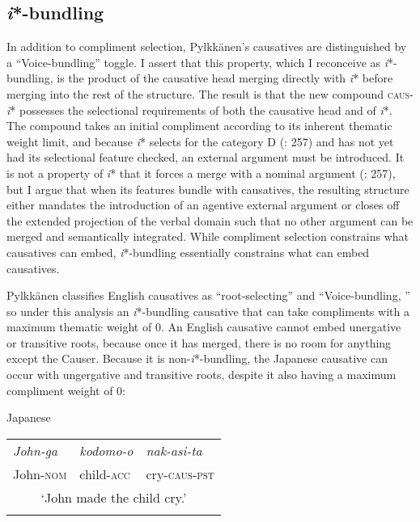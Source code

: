 \documentclass[output=paper]{langscibook}
\begin{document}
\subsection{\textit{i}*-bundling}\label{sec:wechsler:2.4}

In addition to compliment selection, Pylkkänen’s causatives are distinguished by a “Voice-bundling” toggle. I assert that this property, which I reconceive as \textit{i}*-bundling, is the product of the causative head merging directly with \textit{i}* before merging into the rest of the structure. The result is that the new compound \textsc{caus}{}-\textit{i}* possesses the selectional requirements of both the causative head and of \textit{i}*. The compound takes an initial compliment according to its inherent thematic weight limit, and because \textit{i}* selects for the category D (\citealt{WoodMarantz2017}: 257) and has not yet had its selectional feature checked, an external argument must be introduced. It is not a property of \textit{i}* that it forces a merge with a nominal argument (\citealt{WoodMarantz2017}: 257), but I argue that when its features bundle with causatives, the resulting structure either mandates the introduction of an agentive external argument or closes off the extended projection of the verbal domain such that no other argument can be merged and semantically integrated. While compliment selection constrains what causatives can embed, \textit{i}*-bundling essentially constrains what can embed causatives. 



Pylkkänen classifies English causatives as “root-selecting” and “Voice-bundling, ” so under this analysis an \textit{i}*-bundling causative that can take compliments with a maximum thematic weight of 0. An English causative cannot embed unergative or transitive roots, because once it has merged, there is no room for anything except the Causer. Because it is non-\textit{i}*-bundling, the Japanese causative can occur with ungergative and transitive roots, despite it also having a maximum compliment weight of 0: 


\ea\label{ex:wechsler:11}
Japanese \citep[120]{Pylkkänen2008}\\

\tablefirsthead{}

\tabletail{}
\tablelasttail{}
\begin{tabularx}{\textwidth}{XXX}
\lsptoprule
\textit{John-ga} & \textit{kodomo-o} & \textit{nak-asi-ta}\\
John-\textsc{nom} & child-\textsc{acc} & cry-\textsc{caus-pst}\\
\multicolumn{3}{c}{‘John made the child cry.’}\\
\lspbottomrule
\end{tabularx}
\z
\end{document}
